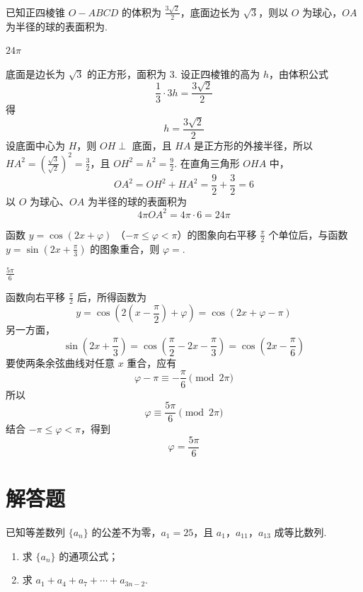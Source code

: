 \begin{problem}
已知正四棱锥 \(O - ABCD\) 的体积为 \(\frac{3\sqrt{2}}{2}\)，底面边长为 \(\sqrt{3}\)，则以 \(O\) 为球心，\(OA\) 为半径的球的表面积为\fillinblank{}.
\end{problem}

\begin{answer}
\(24\pi\)
\end{answer}

\begin{solution}
底面是边长为 \(\sqrt{3}\) 的正方形，面积为 \(3\). 设正四棱锥的高为 \(h\)，由体积公式
\[
\frac13\cdot3h=\frac{3\sqrt{2}}{2}
\]
得
\[
h=\frac{3\sqrt{2}}{2}
\]
设底面中心为 \(H\)，则 \(OH\perp\) 底面，且 \(H A\) 是正方形的外接半径，所以 \(HA^2=\left(\frac{\sqrt{3}}{\sqrt{2}}\right)^2=\frac32\)，且 \(OH^2=h^2=\frac92\).
在直角三角形 \(OHA\) 中，
\[
OA^2=OH^2+HA^2=\frac92+\frac32=6
\]
以 \(O\) 为球心、\(OA\) 为半径的球的表面积为
\[
4\pi OA^2=4\pi\cdot6=24\pi
\]
\end{solution}

\begin{problem}
函数 \( y = \cos (2x + \varphi) \) （\(- \pi \leqslant \varphi < \pi\)）的图象向右平移 \( \frac{\pi}{2} \) 个单位后，与函数 \( y = \sin \left(2x + \frac{\pi}{3}\right) \) 的图象重合，则 \( \varphi =\)\fillinblank{}.
\end{problem}

\begin{answer}
\(\frac{5\pi}{6}\)
\end{answer}

\begin{solution}
函数向右平移 \(\frac{\pi}{2}\) 后，所得函数为
\[
y=\cos\left(2\left(x-\frac{\pi}{2}\right)+\varphi\right)
=\cos(2x+\varphi-\pi)
\]
另一方面，
\[
\sin\left(2x+\frac{\pi}{3}\right)
=\cos\left(\frac{\pi}{2}-2x-\frac{\pi}{3}\right)
=\cos\left(2x-\frac{\pi}{6}\right)
\]
要使两条余弦曲线对任意 \(x\) 重合，应有
\[
\varphi-\pi\equiv-\frac{\pi}{6}\pmod{2\pi}
\]
所以
\[
\varphi\equiv\frac{5\pi}{6}\pmod{2\pi}
\]
结合 \(-\pi\leqslant\varphi<\pi\)，得到
\[
\varphi=\frac{5\pi}{6}
\]
\end{solution}

\section{解答题}

\begin{problem}
已知等差数列 \(\{a_{n}\}\) 的公差不为零，\(a_{1} = 25\)，且 \(a_{1}\)，\(a_{11}\)，\(a_{13}\) 成等比数列.
\begin{enumerate}
\item 求 \(\{a_{n}\}\) 的通项公式；
\item 求 \(a_{1} + a_{4} + a_{7} + \cdots + a_{3n - 2}\).
\end{enumerate}
\end{problem}

